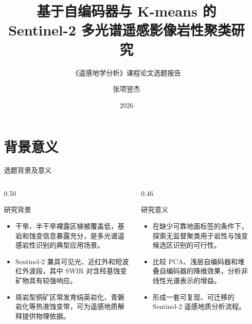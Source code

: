 \documentclass[10pt,aspectratio=169]{beamer}
\title[课程论文选题报告]{基于自编码器与 K-means 的\\Sentinel-2 多光谱遥感影像岩性聚类研究}
\subtitle{《遥感地学分析》课程论文选题报告}
\author[张项翌杰]{张项翌杰}
\institute[ZJU]{浙江大学}
\date{2026}
\begin{document}
\begin{frame}
  \titlepage
\end{frame}

\section{背景意义}
\begin{frame}{选题背景及意义}
  \begin{columns}[T,onlytextwidth]
    \begin{column}{0.50\linewidth}
      \begin{block}{研究背景}
        \begin{itemize}
          \item 干旱、半干旱裸露区植被覆盖低，基岩和蚀变信息暴露充分，是多光谱遥感岩性识别的典型应用场景。
          \item Sentinel-2 兼具可见光、近红外和短波红外波段，其中 SWIR 对含羟基蚀变矿物具有较强响应。
          \item 斑岩型铜矿区常发育绢英岩化、青磐岩化等热液蚀变带，可为遥感地质解释提供物理依据。
        \end{itemize}
      \end{block}
    \end{column}
    \begin{column}{0.46\linewidth}
      \begin{block}{研究意义}
        \begin{itemize}
          \item 在缺少可靠地面标签的条件下，探索无监督聚类用于岩性与蚀变候选区识别的可行性。
          \item 比较 PCA、浅层自编码器和堆叠自编码器的降维效果，分析非线性光谱表示的增益。
          \item 形成一套可复现、可迁移的 Sentinel-2 遥感地质分析流程。
        \end{itemize}
      \end{block}
    \end{column}
  \end{columns}
\end{frame}
\end{document}
